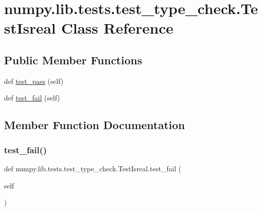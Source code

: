 \hypertarget{classnumpy_1_1lib_1_1tests_1_1test__type__check_1_1TestIsreal}{}\section{numpy.\+lib.\+tests.\+test\+\_\+type\+\_\+check.\+Test\+Isreal Class Reference}
\label{classnumpy_1_1lib_1_1tests_1_1test__type__check_1_1TestIsreal}
\subsection*{Public Member Functions}
\begin{DoxyCompactItemize}
\item 
def \hyperlink{classnumpy_1_1lib_1_1tests_1_1test__type__check_1_1TestIsreal_a97a6056d40560ec0c8a6e99d37362966}{test\+\_\+pass} (self)
\item 
def \hyperlink{classnumpy_1_1lib_1_1tests_1_1test__type__check_1_1TestIsreal_a9bc7f31de876bf27ad2b92f8d047d3f8}{test\+\_\+fail} (self)
\end{DoxyCompactItemize}


\subsection{Member Function Documentation}
\mbox{\label{classnumpy_1_1lib_1_1tests_1_1test__type__check_1_1TestIsreal_a9bc7f31de876bf27ad2b92f8d047d3f8}} 
\subsubsection{\texorpdfstring{test\+\_\+fail()}{test\_fail()}}
{\footnotesize\ttfamily def numpy.\+lib.\+tests.\+test\+\_\+type\+\_\+check.\+Test\+Isreal.\+test\+\_\+fail (\begin{DoxyParamCaption}\item[{}]{self }\end{DoxyParamCaption})}

